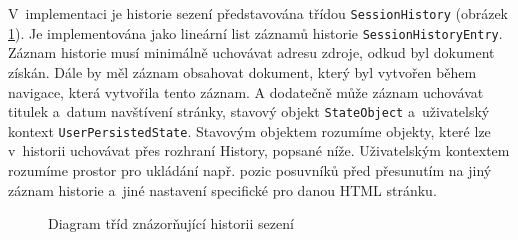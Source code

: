\vspace{-1em}

V~implementaci je historie sezení představována třídou \texttt{SessionHistory} (obrázek \ref{Figure.SessionHistoryDiagram}). Je implementována jako lineární list záznamů historie \texttt{SessionHistoryEntry}. Záznam historie musí minimálně uchovávat adresu zdroje, odkud byl dokument získán. Dále by měl záznam obsahovat dokument, který byl vytvořen během navigace, která vytvořila tento záznam. A dodatečně může záznam uchovávat titulek a~datum navštívení stránky, stavový objekt \texttt{StateObject} a~uživatelský kontext \texttt{UserPersistedState}. Stavovým objektem rozumíme objekty, které lze v~historii uchovávat přes rozhraní History, popsané níže. Uživatelským kontextem rozumíme prostor pro ukládání např. pozic posuvníků před přesunutím na jiný záznam historie a~jiné nastavení specifické pro danou HTML stránku. 

\begin{figure}[H]
  \begin{center}
    \caption{Diagram tříd znázorňující historii sezení}
    \label{Figure.SessionHistoryDiagram}
  \end{center}
\end{figure}

